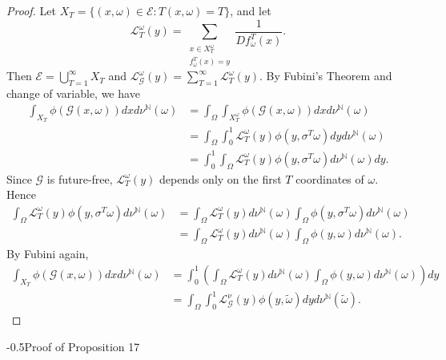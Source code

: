 \documentclass[11pt,oneside]{article}
\makeatletter
\theoremstyle{plain}
\numberwithin{equation}{section}
\numberwithin{figure}{section}
\numberwithin{table}{section}
\renewcommand{\subsection}{\@startsection{subsection}{1}{0mm}
{-\baselineskip}{0.5\baselineskip}{\large\bf\leftline}}
\makeatother
\begin{document}
\begin{proof}

Let $X_T = \{ (x, \omega) \in \mathcal E: T(x, \omega) = T \}$, and let 
\[
\mathcal L_T^{\omega}(y) = \sum_{\substack{x \in X_T^{\omega} \\ f_{\omega}^T(x) = y}} \frac{1}{D f_{\omega}^T(x)}.
\]
Then $\mathcal E = \bigcup_{T=1}^{\infty} X_T$ and $ \mathcal L_{\mathscr G}^{\omega} (y)  = \sum_{T=1}^{\infty}  \mathcal L_{T}^{\omega} (y) $. By Fubini's Theorem and change of variable, we have
\begin{align*}
\int_{X_T} \phi(\mathscr G(x, \omega)) dx d \nu^{\mathbb N} (\omega) & = \int_{\Omega} \int_{X_T^{\omega}} \phi(\mathscr G(x, \omega)) dx d \nu^{\mathbb N} (\omega)\\
& =\int_{\Omega} \int_0^1 \mathcal L_T^{\omega}(y) \phi(y, \sigma^T \omega) dy d \nu^{\mathbb N} (\omega)\\
&=\int_0^1 \int_{\Omega}  \mathcal L_T^{\omega}(y) \phi(y, \sigma^T \omega)  d \nu^{\mathbb N} (\omega) dy.
\end{align*}
Since $\mathscr G$ is future-free, $\mathcal L_T^{\omega}(y)$ depends only on the first $T$ coordinates of $\omega$. Hence
\begin{align*}
\int_{\Omega}  \mathcal L_T^{\omega}(y) \phi(y, \sigma^T \omega)  d \nu^{\mathbb N} (\omega) & =\int_{\Omega}  \mathcal L_T^{\omega}(y)  d \nu^{\mathbb N} (\omega) \int_{\Omega} \phi(y, \sigma^T \omega)  d \nu^{\mathbb N} (\omega) \\
& =\int_{\Omega}  \mathcal L_T^{\omega}(y)  d \nu^{\mathbb N} (\omega) \int_{\Omega} \phi(y, \omega)  d \nu^{\mathbb N} (\omega).
\end{align*}
By Fubini again,
\begin{align*}
\int_{X_T} \phi(\mathscr G(x, \omega)) dx d \nu^{\mathbb N} (\omega) & = \int_0^1 \left( \int_{\Omega}  \mathcal L_T^{\omega}(y)  d \nu^{\mathbb N} (\omega) \int_{\Omega} \phi(y, \omega)  d \nu^{\mathbb N} (\omega)\right) dy\\
& = \int_{\Omega} \int_0^1 \mathcal L_{\mathscr G}^{\nu} (y) \phi(y, \tilde \omega) dy d  \nu^{\mathbb N} (\tilde \omega).
\end{align*}


\end{proof}


\subsection{Proof of Proposition 17}
\end{document}
